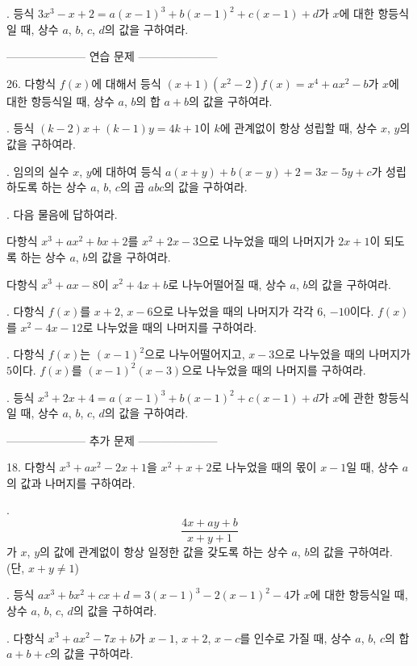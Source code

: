 \documentclass{memoir}
\begin{document}
.
등식 \(3x^3-x+2=a(x-1)^3+b(x-1)^2+c(x-1)+d\)가 \(x\)에 대한 항등식일 때, 상수 \(a\), \(b\), \(c\), \(d\)의 값을 구하여라.

\bigskip
--------------------- 연습 문제 ---------------------

26.
다항식 \(f(x)\)에 대해서 등식 \((x+1)(x^2-2)f(x)=x^4+ax^2-b\)가 \(x\)에 대한 항등식일 때, 상수 \(a\), \(b\)의 합 \(a+b\)의 값을 구하여라.

.
등식 \((k-2)x+(k-1)y=4k+1\)이 \(k\)에 관계없이 항상 성립할 때, 상수 \(x\), \(y\)의 값을 구하여라.

.
임의의 실수 \(x\), \(y\)에 대하여 등식 \(a(x+y)+b(x-y)+2=3x-5y+c\)가 성립하도록 하는 상수 \(a\), \(b\), \(c\)의 곱 \(abc\)의 값을 구하여라.

.
다음 물음에 답하여라.

다항식 \(x^3+ax^2+bx+2\)를 \(x^2+2x-3\)으로 나누었을 때의 나머지가 \(2x+1\)이 되도록 하는 상수 \(a\), \(b\)의 값을 구하여라.

다항식 \(x^3+ax-8\)이 \(x^2+4x+b\)로 나누어떨어질 때, 상수 \(a\), \(b\)의 값을 구하여라.

.
다항식 \(f(x)\)를 \(x+2\), \(x-6\)으로 나누었을 때의 나머지가 각각 \(6\), \(-10\)이다.
\(f(x)\)를 \(x^2-4x-12\)로 나누었을 때의 나머지를 구하여라.

.
다항식 \(f(x)\)는 \((x-1)^2\)으로 나누어떨어지고, \(x-3\)으로 나누었을 때의 나머지가 \(5\)이다.
\(f(x)\)를 \((x-1)^2(x-3)\)으로 나누었을 때의 나머지를 구하여라.

.
등식 \(x^3+2x+4=a(x-1)^3+b(x-1)^2+c(x-1)+d\)가 \(x\)에 관한 항등식일 때, 상수 \(a\), \(b\), \(c\), \(d\)의 값을 구하여라.

--------------------- 추가 문제 ---------------------

18.
다항식 \(x^3+ax^2-2x+1\)을 \(x^2+x+2\)로 나누었을 때의 몫이 \(x-1\)일 때, 상수 \(a\)의 값과 나머지를 구하여라.

.
\[\frac{4x+ay+b}{x+y+1}\]
가 \(x\), \(y\)의 값에 관계없이 항상 일정한 값을 갖도록 하는 상수 \(a\), \(b\)의 값을 구하여라. (단, \(x+y\neq1\))

.
등식 \(ax^3+bx^2+cx+d=3(x-1)^3-2(x-1)^2-4\)가 \(x\)에 대한 항등식일 때, 상수 \(a\), \(b\), \(c\), \(d\)의 값을 구하여라.

.
다항식 \(x^3+ax^2-7x+b\)가 \(x-1\), \(x+2\), \(x-c\)를 인수로 가질 때, 상수 \(a\), \(b\), \(c\)의 합 \(a+b+c\)의 값을 구하여라.
\end{document}
